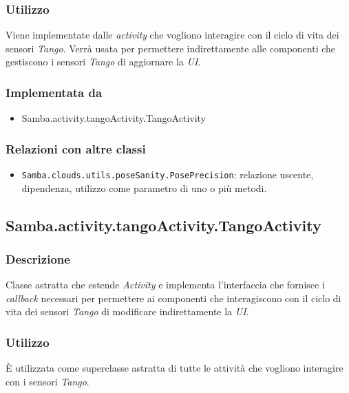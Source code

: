 \subsubsection{Utilizzo}
Viene implementate dalle \emph{activity} che vogliono interagire con il ciclo di vita dei sensori \emph{Tango}. Verrà usata per permettere indirettamente alle componenti che gestiscono i sensori \emph{Tango} di aggiornare la \emph{UI}.
\subsubsection{Implementata da}
\begin{itemize}
	\item Samba.activity.tangoActivity.TangoActivity
\end{itemize}
\subsubsection{Relazioni con altre classi}
\begin{itemize}
 \item \texttt{Samba.clouds.utils.poseSanity.PosePrecision}: relazione uscente, dipendenza, utilizzo come parametro di uno o più metodi.
\end{itemize}

\subsection{Samba.activity.tangoActivity.TangoActivity}
\subsubsection{Descrizione}
Classe astratta che estende \emph{Activity} e implementa l'interfaccia che fornisce i \emph{callback} necessari per permettere ai componenti che interagiscono con il ciclo di vita dei sensori \emph{Tango} di modificare indirettamente la \emph{UI}.
\subsubsection{Utilizzo}
È utilizzata come superclasse astratta di tutte le attività che vogliono interagire con i sensori \emph{Tango}.
